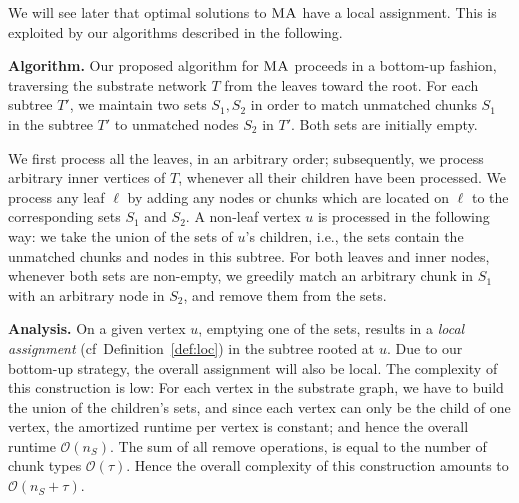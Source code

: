 \documentclass[9pt]{sigcomm-alternate}
\newcommand{\ChunkType}{\tau}
\newcommand{\MA}{\textsc{MA}}
\newcommand{\Tree}{\ensuremath{T}}
\begin{document}
We will see later that
optimal solutions to
$\MA$ have a local assignment. This is exploited by our algorithms described
in the following.

\textbf{Algorithm.} Our proposed algorithm for $\MA$
proceeds in a bottom-up fashion, traversing the substrate network $\Tree$
from the leaves toward the root.
For each subtree $\Tree'$, we maintain
two sets $S_1,S_2$ in order to match unmatched
chunks $S_1$ in the subtree $\Tree'$ to unmatched
nodes $S_2$ in $\Tree'$. Both sets are initially empty.

We first process all the leaves, in an arbitrary order; subsequently, we process arbitrary inner vertices
of $\Tree$, whenever all their children have been processed.
We process any leaf $\ell$
by adding any
nodes or chunks which are located on $\ell$ to the corresponding sets $S_1$ and $S_2$.
A non-leaf vertex $u$ is processed in the following way: we take the union of
the sets of $u$'s children, i.e., the sets contain the unmatched chunks and nodes
in this subtree.
For both leaves and inner nodes, whenever
both sets are non-empty, we greedily match an arbitrary chunk in $S_1$ with an arbitrary node in $S_2$,
and remove them from the sets.

\textbf{Analysis.} On a given vertex $u$, emptying one of the sets, results in a \emph{local assignment} (cf~Definition~\ref{def:loc})
in the
subtree rooted at $u$. Due to our bottom-up strategy, the overall assignment
will also be local.
The complexity of this
construction is low: For each
vertex in the substrate graph, 
we have to build the union of the children's sets, 
and since each vertex can only be the child of one vertex, 
the amortized runtime per vertex is constant; and hence the overall
runtime $\mathcal{O}(n_S)$. The sum of all remove operations, is equal to
the number of chunk types $\mathcal{O}(\ChunkType)$. 
Hence the overall complexity of this construction amounts to
$\mathcal{O}(n_S + \ChunkType)$.
\end{document}
